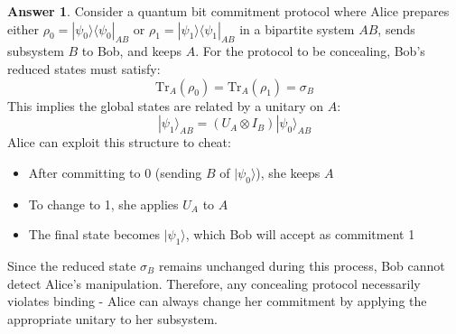 \documentclass[12pt]{article}
\theoremstyle{plain}
\theoremstyle{definition}
\newtheorem{ans}{Answer}
\begin{document}
\begin{ans}
    Consider a quantum bit commitment protocol where Alice prepares either $\rho_0 = |\psi_0\rangle\langle\psi_0|_{AB}$ or $\rho_1 = |\psi_1\rangle\langle\psi_1|_{AB}$ in a bipartite system $AB$, sends subsystem $B$ to Bob, and keeps $A$.
    For the protocol to be concealing, Bob's reduced states must satisfy:
    \[ \text{Tr}_A(\rho_0) = \text{Tr}_A(\rho_1) = \sigma_B \]
    This implies the global states are related by a unitary on $A$:
    \[ |\psi_1\rangle_{AB} = (U_A \otimes I_B)|\psi_0\rangle_{AB} \]
    Alice can exploit this structure to cheat:
    \begin{itemize}
        \item After committing to 0 (sending $B$ of $|\psi_0\rangle$), she keeps $A$
        \item To change to 1, she applies $U_A$ to $A$
        \item The final state becomes $|\psi_1\rangle$, which Bob will accept as commitment 1
    \end{itemize}
    Since the reduced state $\sigma_B$ remains unchanged during this process, Bob cannot detect Alice's manipulation. Therefore, any concealing protocol necessarily violates binding - Alice can always change her commitment by applying the appropriate unitary to her subsystem.
\end{ans}
\end{document}
